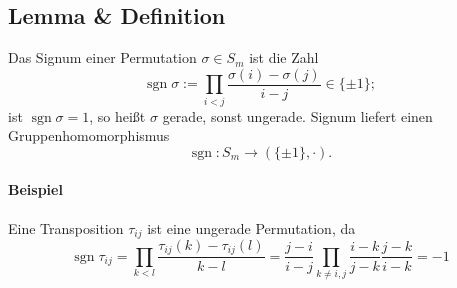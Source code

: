 \subsection{Lemma \& Definition}
	\begin{Definition}
	Das Signum einer Permutation $ \sigma\in S_m $ ist die Zahl
		\[ \operatorname{sgn}\sigma := \prod_{i<j} \frac{\sigma(i)-\sigma(j)}{i-j}\in \{\pm 1\}; \]
	ist $ \operatorname{sgn}\sigma = 1 $, so heißt $ \sigma $ gerade, sonst ungerade. Signum liefert einen Gruppenhomomorphismus
		\[ \operatorname{sgn}: S_m\to (\{\pm 1\},\cdot). \]
	\end{Definition}
\paragraph{Beispiel}
	Eine Transposition $ \tau_{ij} $ ist eine ungerade Permutation, da
		\[ \operatorname{sgn}\tau_{ij} = \prod_{k<l}\frac{\tau_{ij}(k)-\tau_{ij}(l)}{k-l} = \frac{j-i}{i-j}\prod_{k\neq i,j}\frac{i-k}{j-k}\frac{j-k}{i-k} = -1 \]
